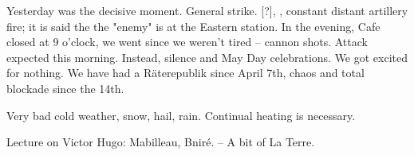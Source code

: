 
Yesterday was the decisive moment. General strike. [?], , constant distant artillery fire; it is said the the "enemy" is at the Eastern station. In the evening, Cafe closed at 9 o'clock, we went since we weren't tired -- cannon shots. Attack expected this morning. Instead, silence and May Day celebrations. We got excited for nothing. We have had a Räterepublik since April 7th, chaos and total blockade since the 14th.

Very bad cold weather, snow, hail, rain. Continual heating is necessary. 

Lecture on Victor Hugo: Mabilleau, Bniré. -- A bit of La Terre.